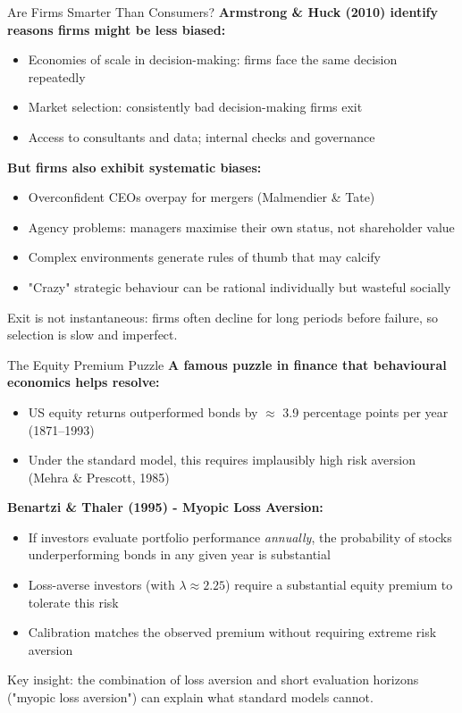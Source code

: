 \documentclass[10pt]{beamer}
\begin{document}
\begin{frame}{Are Firms Smarter Than Consumers?}
\textbf{Armstrong \& Huck (2010) identify reasons firms might be less biased:}

\begin{itemize}
\item Economies of scale in decision-making: firms face the same decision repeatedly
\item Market selection: consistently bad decision-making firms exit
\item Access to consultants and data; internal checks and governance
\end{itemize}


\textbf{But firms also exhibit systematic biases:}
\begin{itemize}
\item Overconfident CEOs overpay for mergers (Malmendier \& Tate)
\item Agency problems: managers maximise their own status, not shareholder value
\item Complex environments generate rules of thumb that may calcify
\item "Crazy" strategic behaviour can be rational individually but wasteful socially
\end{itemize}


\alert{Exit is not instantaneous:} firms often decline for long periods before failure, so selection is slow and imperfect.
\end{frame}


\begin{frame}[allowframebreaks]{The Equity Premium Puzzle}
\textbf{A famous puzzle in finance that behavioural economics helps resolve:}

\begin{itemize}
\item US equity returns outperformed bonds by $\approx$ 3.9 percentage points per year (1871--1993)
\item Under the standard model, this requires implausibly high risk aversion (Mehra \& Prescott, 1985)
\end{itemize}


\textbf{Benartzi \& Thaler (1995) - Myopic Loss Aversion:}
\begin{itemize}
\item If investors evaluate portfolio performance \emph{annually}, the probability of stocks underperforming bonds in any given year is substantial
\item Loss-averse investors (with $\lambda \approx 2.25$) require a substantial equity premium to tolerate this risk
\item Calibration matches the observed premium without requiring extreme risk aversion
\end{itemize}


\alert{Key insight:} the combination of loss aversion and short evaluation horizons ("myopic loss aversion") can explain what standard models cannot.
\end{frame}
\end{document}
